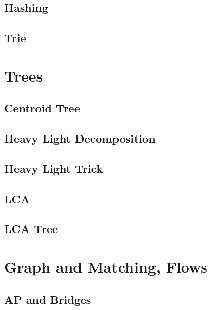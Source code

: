 \documentclass[12pt]{extarticle}
\begin{document}
\begin{multicols*}{2}
\subsection{Hashing} %


\subsection{Trie} %


\section{Trees}

\subsection{Centroid Tree} %


\subsection{Heavy Light Decomposition} %


\subsection{Heavy Light Trick} %


\subsection{LCA} %


\subsection{LCA Tree} %


\section{Graph and Matching, Flows}

\subsection{AP and Bridges} %



\end{multicols*}
\end{document}
